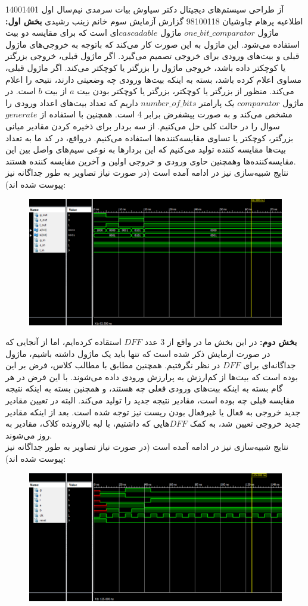 \documentclass[a4paper,12pt]{article}
\begin{document}
\handout
{آز طراحی سیستم‌های دیجیتال}
{دکتر سیاوش بیات سرمدی}
{نیم‌سال اول 1400\lr{-}1401}
{اطلاعیه}
{پرهام چاوشیان}
{98100118}
 {گزارش آزمایش سوم}
{خانم زینب رشیدی}
\textbf{بخش اول: }
ماژول
$one\_bit\_comparator$
ماژول $cascadable$ای است که برای مقایسه دو بیت استفاده می‌شود. این ماژول به این صورت کار می‌کند که باتوجه به خروجی‌های ماژول قبلی و بیت‌های ورودی برای خروجی تصمیم‌ می‌گیرد. اگر ماژول قبلی، خروجی بزرگتر یا کوچکتر داده باشد، خروجی ماژول را بزرگتر یا کوچکتر می‌کند. اگر ماژول قبلی، مساوی اعلام کرده باشد، بسته به اینکه بیت‌ها ورودی چه وضعیتی دارند، نتیحه را اعلام می‌کند. منظور از بزرگتر یا کوچکتر، بزرگتر یا کوچکتر بودن بیت $a$ از بیت $b$ است. در ماژول
$comparator$
یک پارامتر
$number\_of\_bits$
داریم که تعداد بیت‌های اعداد ورودی را مشخص می‌کند و به صورت پیشفرض برابر 4 است. همچنین با استفاده از $generate$ سوال را در حالت کلی حل می‌کنیم. از سه بردار برای ذخیره کردن مقادیر میانی بزرگتر، کوچکتر یا تساوی مقایسه‌کننده‌ها استفاده می‌کنیم. درواقع، در کد ما به تعداد بیت‌ها مقایسه کننده تولید می‌کنیم که این بردارها به نوعی سیم‌های واصل بین این مقایسه‌کننده‌ها وهمچنین حاوی ورودی و خروجی اولین و آخرین مقایسه کننده هستند.\\
نتایج شبیه‌سازی نیز در ادامه آمده است (در صورت نیاز تصاویر به طور جداگانه نیز پیوست شده اند):
\begin{figure}[H]
 \centering
  \includegraphics[width=0.8\linewidth]{s1}
\end{figure}
\textbf{بخش دوم: }
در این بخش ما در واقع از 3 عدد $DFF$ استقاده کرده‌ایم، اما از آنجایی که در صورت ازمایش ذکر شده است که تنها باید یک ماژول داشته باشیم، ماژول جداگانه‌ای برای $DFF$ در نظر نگرفتیم. همچنین مطابق با مطالب کلاس، فرض بر این بوده است که بیت‌ها از کم‌ارزش به پرارزش ورودی داده ‌می‌شوند. با این فرض در هر گام بسته به اینکه بیت‌های ورودی فعلی چه هستند، و همچنین بسته به اینکه نتیجه مقایسه قبلی چه بوده است، مقادیر نتیجه جدید را تولید می‌کند. البته در تعیین مقادیر جدید خروجی به فعال یا غیرفعال بودن ریست نیز توجه شده است. بعد از اینکه مقادیر جدید خروجی تعیین شد، به کمک $DFF$هایی که داشتیم، با لبه بالارونده کلاک، مقادیر به روز می‌شوند.\\
نتایج شبیه‌سازی نیز در ادامه آمده است (در صورت نیاز تصاویر به طور جداگانه نیز پیوست شده اند):
\begin{figure}[H]
 \centering
  \includegraphics[width=0.8\linewidth]{s2}
\end{figure}
\end{document}
